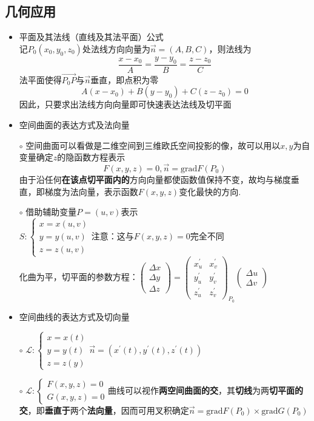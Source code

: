 \documentclass[./main.tex]{subfiles}
\begin{document}
\subsection{几何应用}
\begin{itemize}
  \item 平面及其法线（直线及其法平面）公式\\
    记$P_0(x_0,y_0,z_0)$处法线方向向量为$\vec{n}=(A,B,C)$，则法线为$$\frac{x-x_0}{A}=\frac{y-y_0}{B}=\frac{z-z_0}{C}$$法平面使得$\vec{P_0P}$与$\vec{n}$垂直，即点积为零$$A(x-x_0)+B(y-y_0)+C(z-z_0)=0$$因此，只要求出法线方向向量即可快速表达法线及切平面
  \item 空间曲面的表达方式及法向量
  \item[$\circ$]
    空间曲面可以看做是二维空间到三维欧氏空间投影的像，故可以用以$x,y$为自变量确定$z$的隐函数方程表示
    $$F(x,y,z)=0,\vec{n}=\text{grad}F(P_0)$$由于沿任何\textbf{在该点切平面内的}方向向量都使函数值保持不变，故均与梯度垂直，即梯度为法向量，表示函数$F(x,y,z)$变化最快的方向.
  \item[$\circ$] 借助辅助变量$P=(u,v)$表示\\
    $S:\begin{cases}x=x(u,v)\\y=y(u,v)\\z=z(u,v)\end{cases}$注意：这与$F(x,y,z)=0$完全不同\\化曲为平，切平面的参数方程：$\begin{pmatrix}\Delta x\\\Delta y\\\Delta z \end{pmatrix}=\begin{pmatrix}
      x_u^{\prime} & x_v^{\prime}\\y_u^{\prime} & y_v^{\prime}\\z_u^{\prime} & z_v^{\prime} \end{pmatrix}_{P_0}\begin{pmatrix} \Delta u\\\Delta v \end{pmatrix}$
  \item 空间曲线的表达方式及切向量
  \item[$\circ$] $\mathcal{L}:\begin{cases}x=x(t)\\y=y(t)\\z=z(y)\end{cases}\vec{n}=(x^{\prime}(t),y^{\prime}(t),z^{\prime}(t))$\\
  \item[$\circ$] $\mathcal{L}:\begin{cases}
      F(x,y,z)=0\\G(x,y,z)=0
    \end{cases}$曲线可以视作\textbf{两空间曲面的交}，其\textbf{切线}为两\textbf{切平面的交}，即\textbf{垂直于}两个\textbf{法向量}，因而可用叉积确定$\vec{n}=\text{grad}F(P_0)\times\text{grad}G(P_0)$
\end{itemize}
\end{document}
